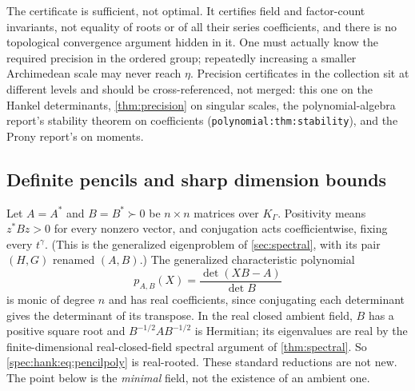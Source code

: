\documentclass[11pt,a4paper]{article}
\numberwithin{equation}{section}
\theoremstyle{definition}
\theoremstyle{remark}
\begin{document}
The certificate is sufficient, not optimal. It certifies field and
factor-count invariants, not equality of roots or of all their series
coefficients, and there is no topological convergence argument hidden in it.
One must actually know the required precision in the ordered group;
repeatedly increasing a smaller Archimedean scale may never reach $\eta$.
Precision certificates in the collection sit at different levels and
should be cross-referenced, not merged: this one on the Hankel determinants,
\cref{thm:precision} on singular scales, the polynomial-algebra report's
stability theorem on coefficients (\texttt{polynomial:thm:stability}), and
the Prony report's on moments.

\subsection{Definite pencils and sharp dimension bounds}
\label{spec:hank:sub:pencils}

Let $A=A^*$ and $B=B^*\succ0$ be $n\times n$ matrices over $K_\Gamma$.
Positivity means $z^*Bz>0$ for every nonzero vector, and conjugation acts
coefficientwise, fixing every $t^\gamma$. (This is the generalized
eigenproblem of \cref{sec:spectral}, with its pair $(H,G)$ renamed $(A,B)$.)
The generalized characteristic polynomial
\begin{equation}\label{spec:hank:eq:pencilpoly}
 p_{A,B}(X)=\frac{\det(XB-A)}{\det B}
\end{equation}
is monic of degree $n$ and has real coefficients, since conjugating each
determinant gives the determinant of its transpose. In the real closed
ambient field, $B$ has a positive square root and $B^{-1/2}AB^{-1/2}$ is
Hermitian; its eigenvalues are real by the finite-dimensional
real-closed-field spectral argument of \cref{thm:spectral}. So
\eqref{spec:hank:eq:pencilpoly} is real-rooted. These standard reductions are
not new. The point below is the \emph{minimal} field, not the existence of an
ambient one.
\end{document}

